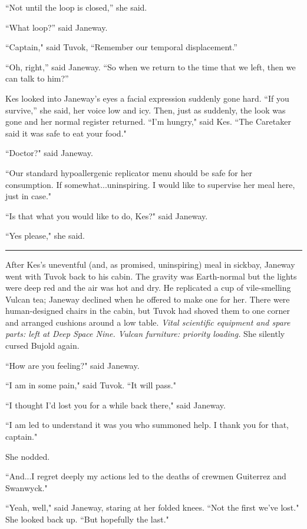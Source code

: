 \documentclass[twoside,letterpaper,12pt]{memoir}
\begin{document}
“Not until the loop is closed,” she said. 

“What loop?” said Janeway. 

``Captain," said Tuvok, ``Remember our temporal displacement.” 

“Oh, right,” said Janeway. “So when we return to the time that we left, then we can talk to him?” 

Kes looked into Janeway’s eyes a facial expression suddenly gone hard. “If you survive,” she said, her voice low and icy. Then, just as suddenly, the look was gone and her normal register returned. ``I'm hungry," said Kes. ``The Caretaker said it was safe to eat your food." 

``Doctor?" said Janeway. 

``Our standard hypoallergenic replicator menu should be safe for her consumption. If somewhat...uninspiring. I would like to supervise her meal here, just in case." 

``Is that what you would like to do, Kes?" said Janeway. 

``Yes please," she said. 

\begin{center}\rule{3cm}{0.4 pt}\end{center} 

After Kes's uneventful (and, as promised, uninspiring) meal in sickbay, Janeway went with Tuvok back to his cabin. The gravity was Earth-normal but the lights were deep red and the air was hot and dry. He replicated a cup of vile-smelling Vulcan tea; Janeway declined when he offered to make one for her. There were human-designed chairs in the cabin, but Tuvok had shoved them to one corner and arranged cushions around a low table. \textit{Vital scientific equipment and spare parts: left at Deep Space Nine. Vulcan furniture: priority loading. }She silently cursed Bujold again. 

``How are you feeling?" said Janeway. 

``I am in some pain," said Tuvok. ``It will pass." 

``I thought I'd lost you for a while back there," said Janeway. 

``I am led to understand it was you who summoned help. I thank you for that, captain." 

She nodded. 

``And...I regret deeply my actions led to the deaths of crewmen Guiterrez and Swanwyck." 

``Yeah, well," said Janeway, staring at her folded knees. ``Not the first we've lost." She looked back up. ``But hopefully the last." 
\end{document}
